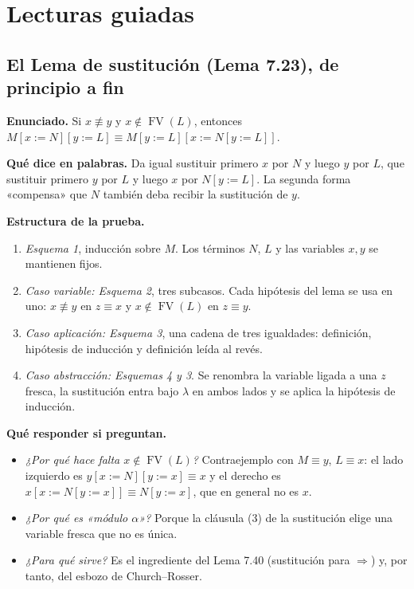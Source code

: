 \documentclass[11pt,a4paper]{article}
\newcommand{\FV}{\operatorname{FV}}
\newcommand{\pr}{\Rightarrow}
\begin{document}
\section{Lecturas guiadas}

\subsection{El Lema de sustitución (Lema 7.23), de principio a fin}

\textbf{Enunciado.} Si \(x\not\equiv y\) y \(x\notin\FV(L)\), entonces
\(M[x:=N][y:=L]\equiv M[y:=L][x:=N[y:=L]]\).

\textbf{Qué dice en palabras.} Da igual sustituir primero \(x\) por \(N\) y
luego \(y\) por \(L\), que sustituir primero \(y\) por \(L\) y luego \(x\) por
\(N[y:=L]\). La segunda forma «compensa» que \(N\) también deba recibir la
sustitución de \(y\).

\textbf{Estructura de la prueba.}
\begin{enumerate}
  \item \emph{Esquema 1}, inducción sobre \(M\). Los términos \(N\), \(L\) y
    las variables \(x,y\) se mantienen fijos.
  \item \emph{Caso variable: Esquema 2}, tres subcasos. Cada hipótesis del
    lema se usa en uno: \(x\not\equiv y\) en \(z\equiv x\) y
    \(x\notin\FV(L)\) en \(z\equiv y\).
  \item \emph{Caso aplicación: Esquema 3}, una cadena de tres igualdades:
    definición, hipótesis de inducción y definición leída al revés.
  \item \emph{Caso abstracción: Esquemas 4 y 3}. Se renombra la variable
    ligada a una \(z\) fresca, la sustitución entra bajo \(\lambda\) en ambos
    lados y se aplica la hipótesis de inducción.
\end{enumerate}

\textbf{Qué responder si preguntan.}
\begin{itemize}
  \item \emph{¿Por qué hace falta \(x\notin\FV(L)\)?} Contraejemplo con
    \(M\equiv y\), \(L\equiv x\): el lado izquierdo es \(y[x:=N][y:=x]\equiv x\)
    y el derecho es \(x[x:=N[y:=x]]\equiv N[y:=x]\), que en general no es
    \(x\).
  \item \emph{¿Por qué es «módulo \(\alpha\)»?} Porque la cláusula (3) de la
    sustitución elige una variable fresca que no es única.
  \item \emph{¿Para qué sirve?} Es el ingrediente del Lema 7.40 (sustitución
    para \(\pr\)) y, por tanto, del esbozo de Church--Rosser.
\end{itemize}
\end{document}
